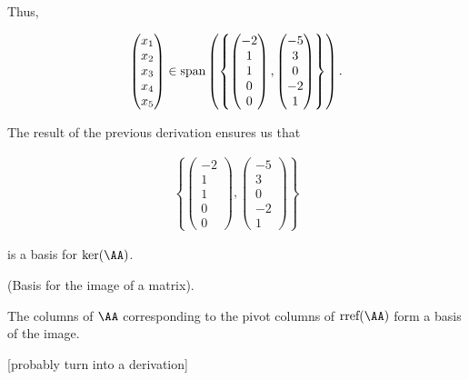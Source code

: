 \begin{example}
    Thus,

    \begin{align*}
        \begin{pmatrix}
            x_1 \\ x_2 \\ x_3 \\ x_4 \\ x_5
        \end{pmatrix}
        \in\text{span}\left(\left\{
        \begin{pmatrix}
            -2 \\ 1 \\ 1 \\ 0 \\ 0
        \end{pmatrix},
        \begin{pmatrix}
            -5 \\ 3 \\ 0 \\ -2 \\ 1
        \end{pmatrix}
        \right\}\right).
    \end{align*}

    The result of the previous derivation ensures us that

    \begin{align*}
        \left\{
        \begin{pmatrix}
            -2 \\ 1 \\ 1 \\ 0 \\ 0
        \end{pmatrix},
        \begin{pmatrix}
            -5 \\ 3 \\ 0 \\ -2 \\ 1
        \end{pmatrix}
        \right\}
    \end{align*}

    is a basis for $\ker(\AA)$. 
\end{example}

\begin{theorem}
    (Basis for the image of a matrix).

    The columns of $\AA$ corresponding to the pivot columns of $\rref(\AA)$ form a basis of the image.

    [probably turn into a derivation]
\end{theorem}

